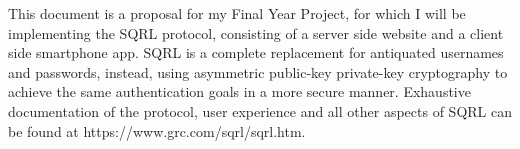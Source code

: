 This document is a proposal for my Final Year Project, for which I will be implementing the SQRL protocol, consisting of a server side website and a client side smartphone app. SQRL is a complete replacement for antiquated usernames and passwords, instead, using asymmetric public-key private-key cryptography to achieve the same authentication goals in a more secure manner. Exhaustive documentation of the protocol, user experience and all other aspects of SQRL can be found at https://www.grc.com/sqrl/sqrl.htm.
